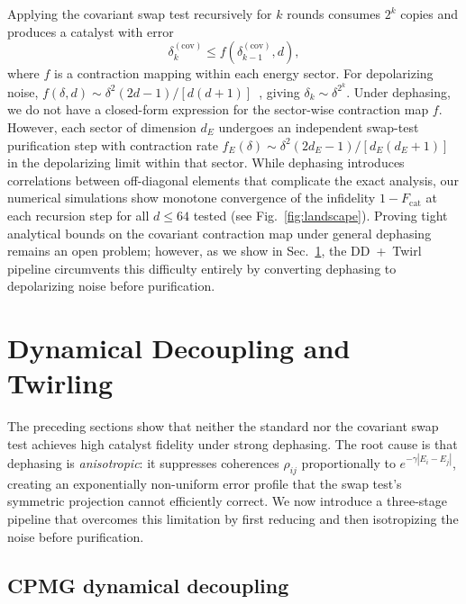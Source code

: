 \documentclass[prx,twocolumn,superscriptaddress,longbibliography,floatfix]{revtex4-2}
\begin{document}
Applying the covariant swap test recursively for $k$ rounds consumes $2^k$ copies and produces a catalyst with error
\begin{equation}
\delta_k^{(\mathrm{cov})} \leq f(\delta_{k-1}^{(\mathrm{cov})}, d),
\label{eq:recursive_bound}
\end{equation}
where $f$ is a contraction mapping within each energy sector.
For depolarizing noise, $f(\delta, d) \sim \delta^2 (2d-1)/[d(d+1)]$~\cite{Childs2025}, giving $\delta_k \sim \delta^{2^k}$.
Under dephasing, we do not have a closed-form expression for the sector-wise contraction map $f$.
However, each sector of dimension $d_E$ undergoes an independent swap-test purification step with contraction rate $f_E(\delta) \sim \delta^2 (2d_E-1)/[d_E(d_E+1)]$ in the depolarizing limit within that sector.
While dephasing introduces correlations between off-diagonal elements that complicate the exact analysis, our numerical simulations show monotone convergence of the infidelity $1 - F_{\mathrm{cat}}$ at each recursion step for all $d \leq 64$ tested (see Fig.~\ref{fig:landscape}).
Proving tight analytical bounds on the covariant contraction map under general dephasing remains an open problem; however, as we show in Sec.~\ref{sec:dd_twirl}, the DD~+~Twirl pipeline circumvents this difficulty entirely by converting dephasing to depolarizing noise before purification.


\section{Dynamical Decoupling and Twirling}
\label{sec:dd_twirl}

The preceding sections show that neither the standard nor the covariant swap test achieves high catalyst fidelity under strong dephasing.
The root cause is that dephasing is \emph{anisotropic}: it suppresses coherences $\rho_{ij}$ proportionally to $e^{-\gamma|E_i - E_j|}$, creating an exponentially non-uniform error profile that the swap test's symmetric projection cannot efficiently correct.
We now introduce a three-stage pipeline that overcomes this limitation by first reducing and then isotropizing the noise before purification.

\subsection{CPMG dynamical decoupling}
\label{sec:dd_model}
\end{document}
